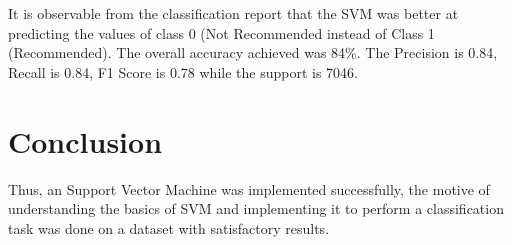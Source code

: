 \documentclass{article}
\begin{document}


It is observable from the classification report that the SVM was better at predicting the values of class 0 (Not Recommended instead of Class 1 (Recommended). The overall accuracy achieved was 84\%. The Precision is 0.84, Recall is 0.84, F1 Score is 0.78 while the support is 7046.

\section{Conclusion}
Thus, an Support Vector Machine was implemented successfully, the motive of understanding the basics of SVM and implementing it to perform a classification task was done on a dataset with satisfactory results.
\end{document}
